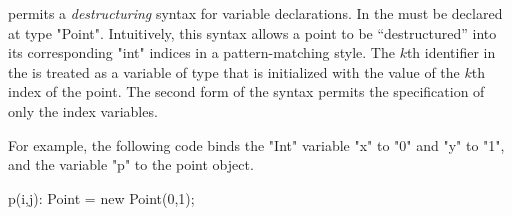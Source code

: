 \Xten{} permits a \emph{destructuring} syntax for variable
declarations.
In \XtenCurrVer{} the  must be declared at
type \xcd"Point". Intuitively, this syntax allows a
point to be ``destructured'' into its corresponding \xcd"int" 
indices in a pattern-matching style.
The $k$th identifier in the 
is treated as a variable of type 
that is initialized with the value of the $k$th index of the point. 
The second form of the syntax permits the specification of only
the index variables.

For example, the following code binds the \xcd"Int" variable \xcd"x" to
\xcd"0" and \xcd"y" to \xcd"1", and the variable \xcd"p" to the
point object.
\begin{xten}
p(i,j): Point = new Point(0,1);
\end{xten}
